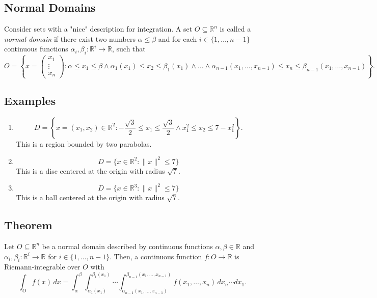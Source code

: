 \documentclass{article}
\begin{document}
\subsection{Normal Domains}
Consider sets with a "nice" description for integration.
A set \( O \subseteq \mathbb{R}^n \) is called a \textit{normal domain} if there exist two numbers \( \alpha \leq \beta \) and for each \( i \in \{1, \dots, n-1\} \) continuous functions \( \alpha_i, \beta_i: \mathbb{R}^i \rightarrow \mathbb{R} \), such that
\[ O = \left\{ x = \begin{pmatrix} x_1 \\ \vdots \\ x_n \end{pmatrix} : \alpha \leq x_1 \leq \beta \land \alpha_1(x_1) \leq x_2 \leq \beta_1(x_1) \land \dots \land \alpha_{n-1}(x_1, \dots, x_{n-1}) \leq x_n \leq \beta_{n-1}(x_1, \dots, x_{n-1}) \right\}. \]

\subsection*{Examples}
\begin{enumerate}
    \item 
    \[ D = \left\{ x = (x_1, x_2) \in \mathbb{R}^2 : -\frac{\sqrt{3}}{2} \leq x_1 \leq \frac{\sqrt{3}}{2} \land x_1^2 \leq x_2 \leq 7 - x_1^2 \right\}. \]
    This is a region bounded by two parabolas.

    \item 
    \[ D = \{ x \in \mathbb{R}^2 : \|x\|^2 \leq 7 \} \]
    This is a disc centered at the origin with radius \( \sqrt{7} \).

    \item 
    \[ D = \{ x \in \mathbb{R}^3 : \|x\|^2 \leq 7 \} \]
    This is a ball centered at the origin with radius \( \sqrt{7} \).
\end{enumerate}

\subsection{Theorem}
Let \( O \subseteq \mathbb{R}^n \) be a normal domain described by continuous functions \( \alpha, \beta \in \mathbb{R} \) and \( \alpha_i, \beta_i : \mathbb{R}^i \rightarrow \mathbb{R} \) for \( i \in \{1, \dots, n-1\} \). Then, a continuous function \( f: O \rightarrow \mathbb{R} \) is Riemann-integrable over \( O \) with
\[ \int_{O} f(x) \, dx = \int_{\alpha}^{\beta} \int_{\alpha_1(x_1)}^{\beta_1(x_1)} \cdots \int_{\alpha_{n-1}(x_1, \dots, x_{n-1})}^{\beta_{n-1}(x_1, \dots, x_{n-1})} f(x_1, \dots, x_n) \, dx_n \cdots dx_1. \]
\newpage
\end{document}
